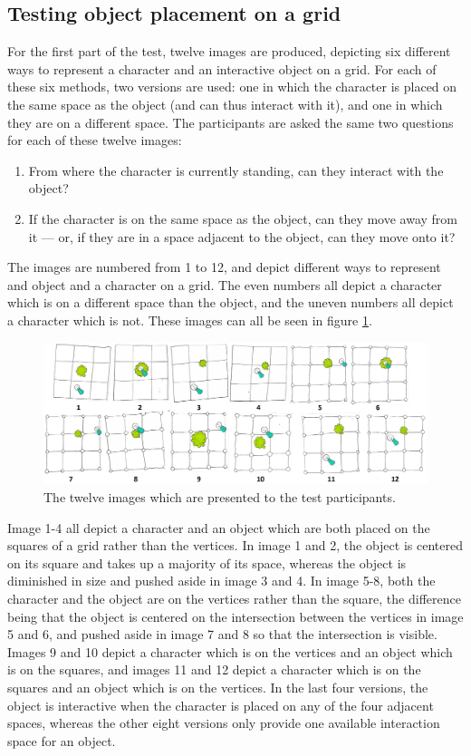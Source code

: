\subsection{Testing object placement on a grid}
For the first part of the test, twelve images are produced, depicting six different ways to represent a character and an interactive object on a grid. For each of these six methods, two versions are used: one in which the character is placed on the same space as the object (and can thus interact with it), and one in which they are on a different space. The participants are asked the same two questions for each of these twelve images:

\begin{enumerate}
    \item From where the character is currently standing, can they interact with the object?
    \item If the character is on the same space as the object, can they move away from it --- or, if they are in a space adjacent to the object, can they move onto it?
\end{enumerate}

The images are numbered from 1 to 12, and depict different ways to represent and object and a character on a grid. The even numbers all depict a character which is on a different space than the object, and the uneven numbers all depict a character which is not. These images can all be seen in figure \ref{fig:papergrid}.

\begin{figure}[h!]
	\centering
	\includegraphics[width=\textwidth]{figures/paper_0.png}
	\caption{The twelve images which are presented to the test participants. \label{fig:papergrid}}
\end{figure}

Image 1-4 all depict a character and an object which are both placed on the squares of a grid rather than the vertices. In image 1 and 2, the object is centered on its square and takes up a majority of its space, whereas the object is diminished in size and pushed aside in image 3 and 4. In image 5-8, both the character and the object are on the vertices rather than the square, the difference being that the object is centered on the intersection between the vertices in image 5 and 6, and pushed aside in image 7 and 8 so that the intersection is visible. Images 9 and 10 depict a character which is on the vertices and an object which is on the squares, and images 11 and 12 depict a character which is on the squares and an object which is on the vertices. In the last four versions, the object is interactive when the character is placed on any of the four adjacent spaces, whereas the other eight versions only provide one available interaction space for an object.

